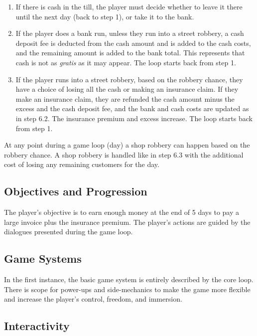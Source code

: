 \documentclass[a4paper,11pt]{article}
\begin{document}
\begin{enumerate}
  \begin{enumerate}
  \def\labelenumii{\arabic{enumii}.} 
  \item
    If there is cash in the till, the player must decide whether to
    leave it there until the next day (back to step 1), or take it to
    the bank.
  \item
    If the player does a bank run, unless they run into a street
    robbery, a cash deposit fee is deducted from the cash amount and is
    added to the cash costs, and the remaining amount is added to the
    bank total. This represents that cash is not as \emph{gratis} as it
    may appear. The loop starts back from step 1.
  \item
    If the player runs into a street robbery, based on the robbery
    chance, they have a choice of losing all the cash or making an
    insurance claim. If they make an insurance claim, they are refunded
    the cash amount minus the excess and the cash deposit fee, and the
    bank and cash costs are updated as in step 6.2. The insurance
    premium and excess increase. The loop starts back from step 1.
  \end{enumerate}
\end{enumerate}

At any point during a game loop (day) a shop robbery can happen based on
the robbery chance. A shop robbery is handled like in step 6.3 with the
additional cost of losing any remaining customers for the day.

\subsection{Objectives and
Progression}\label{objectives-and-progression}

The player's objective is to earn enough money at the end of 5 days to
pay a large invoice plus the insurance premium. The player's actions are
guided by the dialogues presented during the game loop.

\subsection{Game Systems}\label{game-systems}

In the first instance, the basic game system is entirely described by
the core loop. There is scope for power-ups and side-mechanics to make
the game more flexible and increase the player's control, freedom, and
immersion.

\subsection{Interactivity}\label{interactivity}
\end{document}
